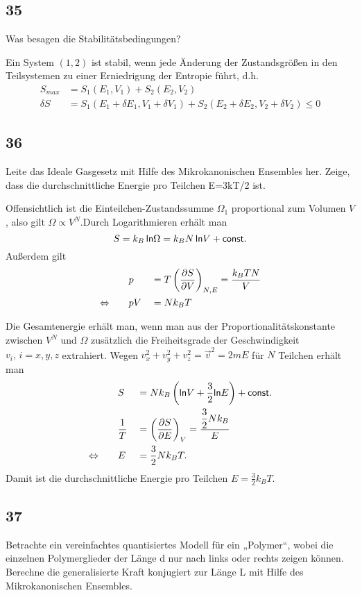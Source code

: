 \subsection{35}
\begin{myfrag}
Was besagen die Stabilitätsbedingungen?
\end{myfrag}
Ein System $(1,2)$ ist stabil, wenn jede Änderung der Zustandsgrößen in den Teilsystemen zu einer Erniedrigung der Entropie führt, d.h.
\begin{align}
	S_{max}&=S_1(E_1,V_1)+S_2(E_2,V_2)\\
	\delta S&=S_1(E_1+\delta E_1,V_1+\delta V_1)+S_2(E_2+\delta E_2,V_2+\delta V_2)\le 0
\end{align}
\subsection{36}
\begin{myfrag}
Leite das Ideale Gasgesetz mit Hilfe des Mikrokanonischen Ensembles her.
Zeige, dass die durchschnittliche Energie pro Teilchen E=3kT/2 ist.
\end{myfrag}
Offensichtlich ist die Einteilchen-Zustandssumme $\Omega_1$ proportional zum Volumen $V$, also gilt $\Omega\propto V^N$.Durch Logarithmieren erhält man
\begin{equation}
	S=k_B\,\mathsf{ln}\Omega=k_BN\,\mathsf{ln} V+\mathsf{const.}
\end{equation}
Außerdem gilt
\begin{alignat}{2}
	&p&&=T\left(\frac{\partial S}{\partial V}\right)_{N,E}=\frac{k_BTN}{V}\\
	\Leftrightarrow\qquad&pV&&=Nk_BT
\end{alignat}
\par Die Gesamtenergie erhält man, wenn man aus der Proportionalitätskonstante zwischen $V^N$ und $\Omega$ zusätzlich die Freiheitsgrade der Geschwindigkeit $v_i,\,i=x,y,z$ extrahiert. Wegen $v_x^2+v_y^2+v_z^2=\vec{v}^2=2mE$ für $N$ Teilchen erhält man
\begin{alignat}{2}
	&S&&=Nk_B\left(\mathsf{ln} V+\frac{3}{2}\mathsf{ln} E\right)+\mathsf{const.}\\
	&\frac{1}{T}&&=\left(\frac{\partial S}{\partial E}\right)_{V}=\frac{\dfrac{3}{2}Nk_B}{E}\\
	\Leftrightarrow\qquad&E&&=\frac{3}{2}Nk_BT.
\end{alignat}
Damit ist die durchschnittliche Energie pro Teilchen $E=\frac{3}{2}k_BT$.
\subsection{37}
\begin{myfrag}
Betrachte ein vereinfachtes quantisiertes Modell für ein „Polymer“, wobei die
einzelnen Polymerglieder der Länge d nur nach links oder rechts zeigen können.
Berechne die generalisierte Kraft konjugiert zur Länge L mit Hilfe des
Mikrokanonischen Ensembles.
\end{myfrag}
